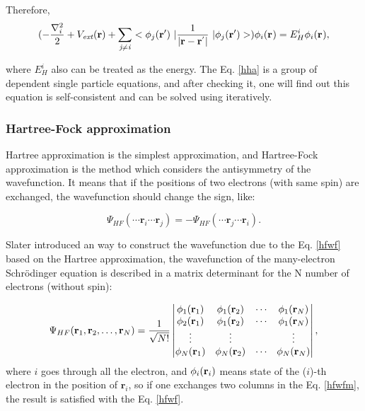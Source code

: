 \documentclass[a4paper, 12pt, titlepage,oneside,drop]{kthesis}
\begin{document}
Therefore,
\begin{equation}
(-\frac{\nabla^{2}_{i}}{2} + V_\textit{ext}(\textbf{r})+ \suminj<j><i> <\bwfn<j><'>\ | \frac{1}{|\textbf{r} - \textbf{r}^{'} |} \ | \bwfn<j><'>>) \bwf<i><> = E^{i}_{H} \bwf<i><>,
\end{equation}

where $E^{i}_{H}$  also can be treated as the energy. The Eq. \ref{hha} is a group of dependent single
 particle equations, and after checking it, one will find out this equation is self-consistent and can be solved using iteratively.

\subsubsection{Hartree-Fock approximation}
Hartree approximation is the simplest approximation, and Hartree-Fock approximation is the method which considers the 
antisymmetry of the wavefunction. It means that if the positions of two electrons (with same spin) are exchanged, the wavefunction should change the sign, like:

\begin{equation}\label{hfwf}
\Psi_\textit{HF} ( \cdots \textbf{r}_\textit{i} \cdots  \textbf{r}_\textit{j} ) = - \Psi_\textit{HF} ( \cdots \textbf{r}_\textit{j} \cdots  \textbf{r}_\textit{i} ).
\end{equation}

Slater introduced an way to construct the wavefunction due to the Eq. \ref{hfwf} based on the Hartree approximation, 
the wavefunction of the many-electron Schrödinger equation is described in a matrix determinant for the N number of electrons 
(without spin):

\begin{equation}\label{hfwfm}
\Psi_{HF}(\mathbf{r}_1, \mathbf{r}_2, \ldots, \mathbf{r}_N) =
\frac{1}{\sqrt{N!}} \left|
\begin{matrix}
    \bwf<1><1> & \bwf<1><2> & \cdots & \bwf<1><N> \\
    \bwf<2><1> & \bwf<1><2> & \cdots & \bwf<1><N> \\
    \vdots               & \vdots               &        & \vdots               \\
    \bwf<N><1> & \bwf<N><2> & \cdots & \bwf<N><N>
\end{matrix} \right|,
\end{equation}
\noindent where $i$ goes through all the electron, and $\bwf<i><i>$ means state of the ($i$)-th electron in the position of $\textbf{r}_\textit{i}$, so if one exchanges two columns
 in the Eq. \ref{hfwfm}, the result is satisfied with the Eq. \ref{hfwf}.
\end{document}
